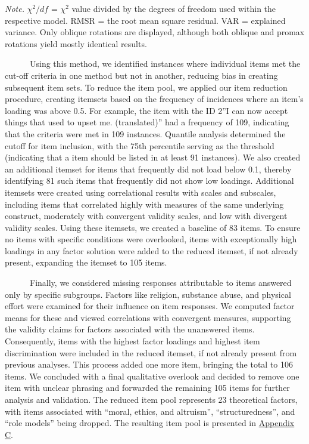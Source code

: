 \documentclass[
  man,floatsintext]{apa7}
\begin{document}
\vspace{-30pt}

\noindent  
\emph{Note.} \(\chi^2/df\) = \(\chi^2\) value divided by the degrees of freedom used within the respective model. RMSR = the root mean square residual. VAR = explained variance. Only oblique rotations are displayed, although both oblique and promax rotations yield mostly identical results. \normalsize \singlespacing \doublespacing

~~~~~~Using this method, we identified instances where individual items met the cut-off criteria in one method but not in another, reducing bias in creating subsequent item sets. To reduce the item pool, we applied our item reduction procedure, creating itemsets based on the frequency of incidences where an item's loading was above 0.5. For example, the item with the ID 2''I can now accept things that used to upset me. (translated)'' had a frequency of 109, indicating that the criteria were met in 109 instances. Quantile analysis determined the cutoff for item inclusion, with the 75th percentile serving as the threshold (indicating that a item should be listed in at least 91 instances). We also created an additional itemset for items that frequently did not load below 0.1, thereby identifying 81 such items that frequently did not show low loadings. Additional itemsets were created using correlational results with scales and subscales, including items that correlated highly with measures of the same underlying construct, moderately with convergent validity scales, and low with divergent validity scales. Using these itemsets, we created a baseline of 83 items. To ensure no items with specific conditions were overlooked, items with exceptionally high loadings in any factor solution were added to the reduced itemset, if not already present, expanding the itemset to 105 items.

~~~~~~Finally, we considered missing responses attributable to items answered only by specific subgroups. Factors like religion, substance abuse, and physical effort were examined for their influence on item responses. We computed factor means for these and viewed correlations with convergent measures, supporting the validity claims for factors associated with the unanswered items. Consequently, items with the highest factor loadings and highest item discrimination were included in the reduced itemset, if not already present from previous analyses. This process added one more item, bringing the total to 106 items. We concluded with a final qualitative overlook and decided to remove one item with unclear phrasing and forwarded the remaining 105 items for further analysis and validation. The reduced item pool represents 23 theoretical factors, with items associated with ``moral, ethics, and altruism'', ``structuredness'', and ``role models'' being dropped. The resulting item pool is presented in \hyperref[appendixc]{Appendix C}.
\end{document}
